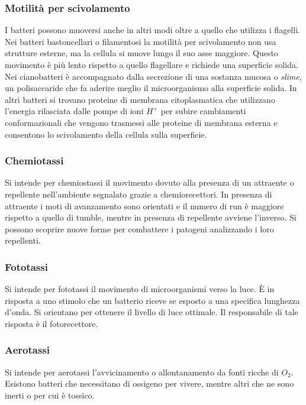 		\subsubsection{Motilit\`a per scivolamento}
		I batteri possono muoversi anche in altri modi oltre a quello che utilizza i flagelli.
		Nei batteri bastoncellari o filamentosi la motilit\`a per scivolamento non usa strutture esterne, ma la cellula si muove lungo il suo asse maggiore.
		Questo movimento \`e pi\`u lento rispetto a quello flagellare e richiede una superficie solida.
		Nei cianobatteri \`e accompagnato dalla secrezione di una sostanza mucosa o \emph{slime}, un polisaccaride che fa aderire meglio il microorganismo alla superficie solida.
		In altri batteri si trovano proteine di membrana citoplasmatica che utilizzano l'energia rilasciata dalle pompe di ioni \emph{$H^+$} per subire cambiamenti conformazionali che vengono trasmessi alle proteine di membrana esterna e consentono lo scivolamento della cellula sulla superficie.

		\subsubsection{Chemiotassi}
		Si intende per chemiostassi il movimento dovuto alla presenza di un attraente o repellente nell'ambiente segnalato grazie a chemiorecettori.
		In presenza di attraente i moti di avanzamento sono orientati e il numero di run \`e maggiore rispetto a quello di tumble, mentre in presenza di repellente avviene l'inverso.
		Si possono scoprire nuove forme per combattere i patogeni analizzando i loro repellenti.

		\subsubsection{Fototassi}
		Si intende per fototassi il movimento di microorganismi verso la luce.
		\`E in risposta a uno stimolo che un batterio riceve se esposto a una specifica lunghezza d'onda.
		Si orientano per ottenere il livello di luce ottimale.
		Il responsabile di tale risposta \`e il fotorecettore.

		\subsubsection{Aerotassi}
		Si intende per aerotassi l'avvicinamento o allontanamento da fonti ricche di \emph{$O_2$}.
		Esistono batteri che necessitano di ossigeno per vivere, mentre altri che ne sono inerti o per cui \`e tossico.

